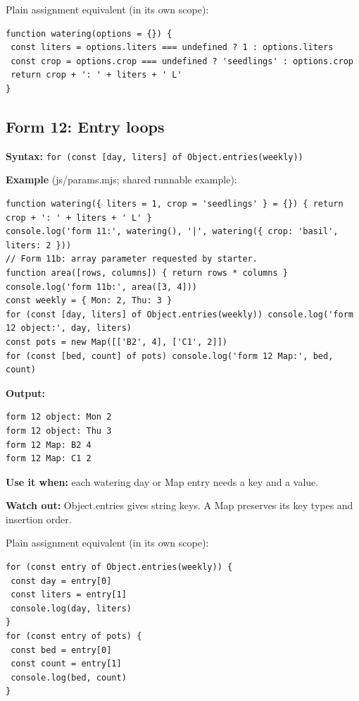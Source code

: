 \documentclass[
  10pt,
  a4paper,
]{article}
\begin{document}
Plain assignment equivalent (in its own scope):

\begin{lstlisting}
function watering(options = {}) {
 const liters = options.liters === undefined ? 1 : options.liters
 const crop = options.crop === undefined ? 'seedlings' : options.crop
 return crop + ': ' + liters + ' L'
}
\end{lstlisting}

\subsection{Form 12: Entry loops}\label{form-12-entry-loops}

\textbf{Syntax:}
\texttt{for (const [day,\allowbreak{} liters] of Object.\allowbreak{}entries(weekly))}

\textbf{Example} (js/params.mjs; shared runnable example):

\begin{lstlisting}
function watering({ liters = 1, crop = 'seedlings' } = {}) { return crop + ': ' + liters + ' L' }
console.log('form 11:', watering(), '|', watering({ crop: 'basil', liters: 2 }))
// Form 11b: array parameter requested by starter.
function area([rows, columns]) { return rows * columns }
console.log('form 11b:', area([3, 4]))
const weekly = { Mon: 2, Thu: 3 }
for (const [day, liters] of Object.entries(weekly)) console.log('form 12 object:', day, liters)
const pots = new Map([['B2', 4], ['C1', 2]])
for (const [bed, count] of pots) console.log('form 12 Map:', bed, count)
\end{lstlisting}

\textbf{Output:}

\begin{lstlisting}
form 12 object: Mon 2
form 12 object: Thu 3
form 12 Map: B2 4
form 12 Map: C1 2
\end{lstlisting}

\textbf{Use it when:} each watering day or Map entry needs a key and a
value.

\textbf{Watch out:} Object.entries gives string keys. A Map preserves
its key types and insertion order.

Plain assignment equivalent (in its own scope):

\begin{lstlisting}
for (const entry of Object.entries(weekly)) {
 const day = entry[0]
 const liters = entry[1]
 console.log(day, liters)
}
for (const entry of pots) {
 const bed = entry[0]
 const count = entry[1]
 console.log(bed, count)
}
\end{lstlisting}
\end{document}

